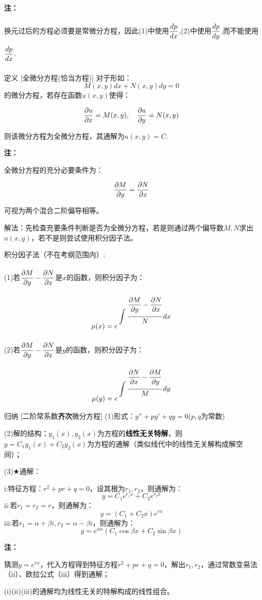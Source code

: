 \documentclass[a4paper,12pt,oneside,fontset=none]{ctexbook}
\let\olddfrac\dfrac
\renewcommand{\dfrac}[2]{
    \olddfrac{#1\vrule width 0pt height 1.15em depth 0em}{#2\vrule width 0pt height 0em depth 0.6em}
}
\let\oldint\int
\renewcommand{\int}{\displaystyle{\vrule width 0pt height 0em depth 0em}\oldint}
\newenvironment{induction}[1][]{\begin{thmBox}{归纳}{#1}}{\end{thmBox}}
\newcounter{definition}[chapter]
\newenvironment{definition}[1][]{\begin{defBox}{定义}{#1}}{\end{defBox}}
\newenvironment{note}{
    \par\vspace{0.5em}\noindent
    \textbf{\color{NoteColor} 注：}
}{
    \par\vspace{0.5em}
}
\numberwithin{equation}{chapter}
\begin{document}
\begin{note}
    换元过后的方程必须要是常微分方程，因此(1)中使用$\dfrac{dp}{dx}$,(2)中使用$\dfrac{dp}{dy}$,而不能使用$\dfrac{dp}{dx}$.
\end{note}

\begin{definition}
    [全微分方程(恰当方程)]
    对于形如：$$M(x,y)dx+N(x,y)dy=0$$的微分方程，若存在函数$u(x,y)$使得：
    $$\dfrac{\partial u}{\partial x}=M(x,y),\quad \dfrac{\partial u}{\partial y}=N(x,y)$$
    则该微分方程为全微分方程，其通解为$u(x,y)=C$.
\end{definition}
\begin{note}
    全微分方程的充分必要条件为：
    $$\dfrac{\partial M}{\partial y}=\dfrac{\partial N}{\partial x}$$
    可视为两个混合二阶偏导相等。

    解法：先检查充要条件判断是否为全微分方程，若是则通过两个偏导数$M,N$求出$u(x,y)$，若不是则尝试使用积分因子法。

    积分因子法（不在考纲范围内）:

    (1)若$\dfrac{\partial M}{\partial y}-\dfrac{\partial N}{\partial x}$是$x$的函数，则积分因子为：
    $$\mu(x)=e^{\int \dfrac{\dfrac{\partial M}{\partial y}-\dfrac{\partial N}{\partial x}}{N}dx}$$

    (2)若$\dfrac{\partial M}{\partial y}-\dfrac{\partial N}{\partial x}$是$y$的函数，则积分因子为：
    $$\mu(y)=e^{\int \dfrac{\dfrac{\partial N}{\partial x}-\dfrac{\partial M}{\partial y}}{M}dy}$$
\end{note}

\begin{induction}
    [二阶常系数\textbf{齐次}微分方程]
    (1)形式：$y''+py'+qy=0$($p,q$为常数)

    (2)解的结构：$y_1(x), y_2(x)$为方程的\textbf{线性无关特解}，则$y=C_1y_1(x)+C_2y_2(x)$为方程的通解（类似线代中的线性无关解构成解空间）；

    (3)$\bigstar$通解：
    
    i:特征方程：$r^2+pr+q=0$，设其根为$r_1,r_2$，则通解为：
    $$y=C_1e^{r_1x}+C_2e^{r_2x}$$
    ii:若$r_1=r_2=r$，则通解为：
    $$y=(C_1+C_2x)e^{rx}$$
    iii:若$r_1=\alpha+\beta i,r_2=\alpha-\beta i$，则通解为：
    $$y=e^{\alpha x}(C_1\cos \beta x+C_2\sin \beta x)$$
\end{induction}
\begin{note}
    猜测$y=e^{rx}$，代入方程得到特征方程$r^2+pr+q=0$，解出$r_1,r_2$，通过常数变易法（ii）、欧拉公式（iii）得到通解；
    
    (i)(ii)(iii)的通解均为线性无关的特解构成的线性组合。
\end{note}
\end{document}
